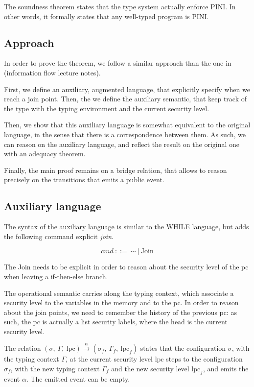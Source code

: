 \documentclass[10pt]{article}
\newcommand{\lpc}{\mathrm{lpc}}
\newcommand{\ctx}{\Gamma}
\newcommand{\conf}{\sigma}
\newcommand{\execaux}[7] { (#1,~#2,~#3) \xrightarrow{#4} (#5,~#6,~#7) }
\begin{document}
The soundness theorem states that the type system actually enforce PINI. In other words, it formally
states that any well-typed program is PINI.


\subsection{Approach}%
\label{subsec:approach}

In order to prove the theorem, we follow a similar approach than the one in (information flow
lecture notes).

First, we define an auxiliary, augmented language, that explicitly specify when we reach a join
point. Then, the we define the auxiliary semantic, that keep track of the type with the typing
environment and the current security level.

Then, we show that this auxiliary language is somewhat equivalent to the original language, in the
sense that there is a correspondence between them. As such, we can reason on the auxiliary language,
and reflect the result on the original one with an adequacy theorem.

Finally, the main proof remains on a bridge relation, that allows to reason precisely on the
transitions that emits a public event.

\subsection{Auxiliary language}%
\label{subsec:aux_lang}

The syntax of the auxiliary language is similar to the WHILE language, but adds the following
command explicit \emph{join}.

\[ \mathit{cmd}~::=~\cdots~|~\mathrm{Join} \]

The Join needs to be explicit in order to reason about the security level of the pc when leaving a
if-then-else branch.

The operational semantic carries along the typing context, which associate a security level to the
variables in the memory and to the pc. In order to reason about the join points, we need to remember
the history of the previous pc: as such, the pc is actually a list security labels, where the head
is the current security level.

The relation \(\execaux{\conf}{\ctx}{\lpc}{\alpha}{\conf_{f}}{\ctx_{f}}{\lpc_{f}} \)
states that the configuration $\conf$, with the typing context $\ctx$, at the current security level
$\lpc$ steps to the configuration $\conf_{f}$, with the new typing context $\ctx_{f}$ and the new
security level $\lpc_{f}$, and emits the event $\alpha$. The emitted event can be empty.
\end{document}
